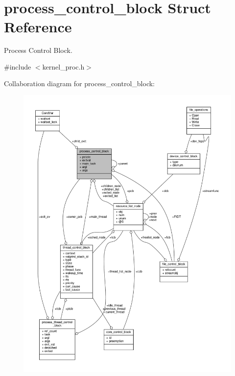 \hypertarget{structprocess__control__block}{}\section{process\+\_\+control\+\_\+block Struct Reference}
\label{structprocess__control__block}


Process Control Block.  




{\ttfamily \#include $<$kernel\+\_\+proc.\+h$>$}



Collaboration diagram for process\+\_\+control\+\_\+block\+:
\nopagebreak
\begin{figure}[H]
\begin{center}
\leavevmode
\includegraphics[width=350pt]{structprocess__control__block__coll__graph}
\end{center}
\end{figure}
